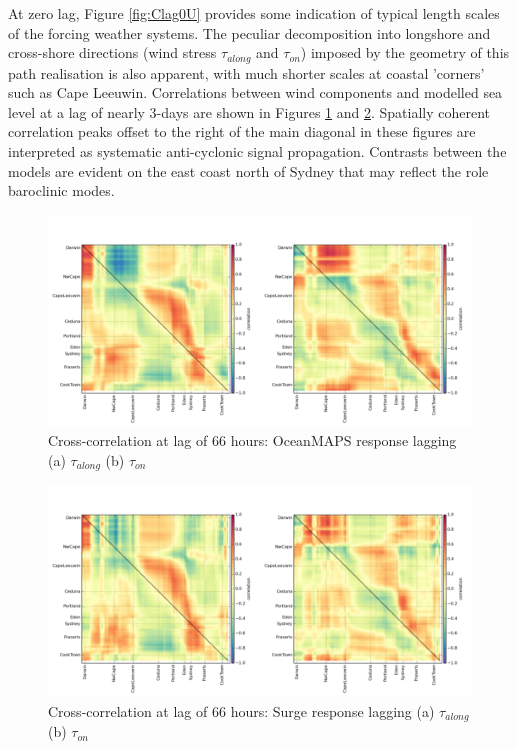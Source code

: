 At zero lag, Figure \ref{fig:Clag0U} provides some indication of typical length scales of the forcing weather systems.  
The peculiar decomposition into longshore and cross-shore directions (wind stress $\tau_{along}$ and $\tau_{on}$) imposed by the geometry of this path realisation is also apparent, with much shorter scales at coastal 'corners' such as Cape Leeuwin.  
Correlations between wind components and modelled sea level at a lag of nearly 3-days are shown in Figures \ref{fig:Clag66sla} and \ref{fig:Clag66surge}.  
Spatially coherent correlation peaks offset to the right of the main diagonal in these figures are interpreted as systematic anti-cyclonic signal propagation. 
Contrasts between the models are evident on the east coast north of Sydney that may reflect the role baroclinic modes.
\newcommand\CAPTIONb{Cross-correlation at lag of 66 hours}
\begin{figure}[H]\centering
    \noindent\includegraphics[width=\figwidthBig]{figures/plots/concatC_sla_lag_066.png}
    \caption[\CAPTIONb{} OceanMAPS]{
             \CAPTIONb{}: 
             OceanMAPS response lagging (a) $\tau_{along}$ (b) $\tau_{on}$} 
    \label{fig:Clag66sla}
\end{figure}

\begin{figure}[H]\centering
    \noindent\includegraphics[width=\figwidthBig]{figures/plots/concatC_surgeg_lag_066.png}
    \caption[\CAPTIONb{} Surge]{
             \CAPTIONb{}: 
             Surge response lagging (a) $\tau_{along}$ (b) $\tau_{on}$} 
    \label{fig:Clag66surge}
\end{figure}


